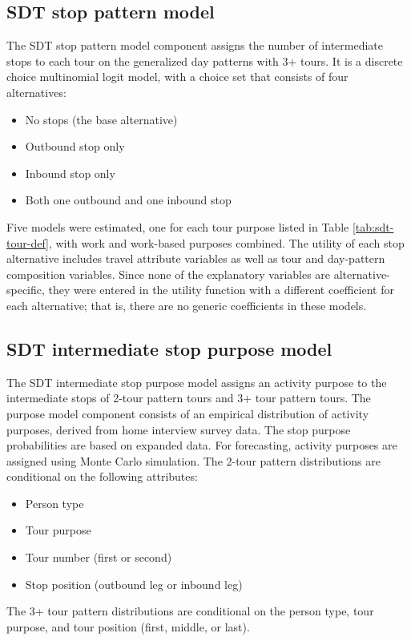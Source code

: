 \subsection{SDT stop pattern model}\label{sec:sdt-stop-pattern}
The SDT stop pattern model component assigns the number of intermediate stops to each tour on the generalized day patterns with 3+ tours. It is a discrete choice multinomial logit model, with a choice set that consists of four alternatives:
\begin{itemize}
\item No stops (the base alternative)
\item Outbound stop only
\item Inbound stop only
\item Both one outbound and one inbound stop
\end{itemize} 

\noindent Five models were estimated, one for each tour purpose listed in Table \ref{tab:sdt-tour-def}, with work and work-based purposes combined. The utility of each stop alternative includes travel attribute variables as well as tour and day-pattern composition variables. Since none of the explanatory variables are alternative-specific, they were entered in the utility function with a different coefficient for each alternative; that is, there are no generic coefficients in these models. 

\subsection{SDT intermediate stop purpose model}
The SDT intermediate stop purpose model assigns an activity purpose to the intermediate stops of 2-tour pattern tours and 3+ tour pattern tours. The purpose model component consists of an empirical distribution of activity purposes, derived from home interview survey data. The stop purpose probabilities are based on expanded data. For forecasting, activity purposes are assigned using Monte Carlo simulation. The 2-tour pattern distributions are conditional on the following attributes:
\begin{itemize}
\item Person type
\item Tour purpose
\item Tour number (first or second)
\item Stop position (outbound leg or inbound leg)
\end{itemize}

\noindent The 3+ tour pattern distributions are conditional on the person type, tour purpose, and tour position (first, middle, or last).

